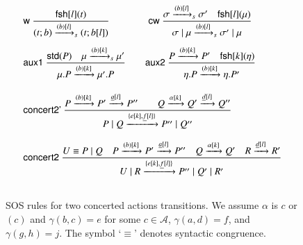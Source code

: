 {\begin{figure}[t] 
$$
\begin{array}{l}
\rulename{w}\
\Rule
{\fresh{l}{t}}
{(t;b) \xrightarrow{(b)[l]}_s (t;b[l])} \qquad\qquad
\rulename{cw}\
\Rule
{\sigma \xrightarrow{(b)[l]}_s \sigma'\quad \fresh{l}{\mu}}
{\sigma \paral \mu \xrightarrow{(b)[l]}_s \sigma' \paral \mu}
\\[20pt]
\rulename{aux1}\ 
\Rule{\std{P} %
  \quad \mu\xrightarrow{(b)[k]}_s \mu'}
{\mu.P \xrightarrow{(b)[k]}\mu'.P}
\qquad
\rulename{aux2}\
\Rule
{P \xrightarrow{(b)[k]} P' \quad \fresh{k}{\eta}}
{\eta.P \xrightarrow{(b)[k]} \eta.P'}
\\[25pt]
\rulename{concert2'}\ 
\Rule
{P\xrightarrow{(b)[k]} P'\xrightarrow{\underline{a}[l]}P'' \qquad Q\xrightarrow{\alpha[k]}Q'\xrightarrow{\underline{d}[l]}Q''%
 }
{P \paral Q\xrightarrow{\{e[k],\underline{f}[l]\}} P'' \paral Q''}\\[25pt]
\rulename{concert2}\ 
\Rule
{U\equiv P \paral Q \quad  P\xrightarrow{(b)[k]}P'\xrightarrow{\underline{a}[l]}P'' 
  \quad Q\xrightarrow{\alpha[k]}Q' 
  \quad R\xrightarrow{\underline{d}[l]}R'%
 }
{U \paral R\xrightarrow{\{e[k],\underline{f}[l]\}} P'' \paral Q'\paral R'} \\[25pt]

\end{array}$$
\caption{SOS rules for two concerted actions transitions. We assume $\alpha$ is $c$ or $(c)$ 
and $\gamma(b,c)=e$ for some $c\in \mathcal{A}$, $\gamma(a,d)=f$, and  $\gamma(g,h)=j$. The symbol `$\equiv$' denotes syntactic congruence.}
\label{fig:c1sos}
\end{figure}


}
